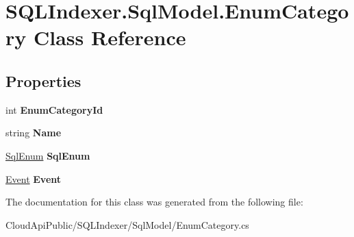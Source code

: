 \hypertarget{class_s_q_l_indexer_1_1_sql_model_1_1_enum_category}{\section{S\-Q\-L\-Indexer.\-Sql\-Model.\-Enum\-Category Class Reference}
\label{class_s_q_l_indexer_1_1_sql_model_1_1_enum_category}
}
\subsection*{Properties}
\begin{DoxyCompactItemize}
\item 
\hypertarget{class_s_q_l_indexer_1_1_sql_model_1_1_enum_category_ab98edd9d27c804192c38e950fcf6fd79}{int {\bfseries Enum\-Category\-Id}}\label{class_s_q_l_indexer_1_1_sql_model_1_1_enum_category_ab98edd9d27c804192c38e950fcf6fd79}

\item 
\hypertarget{class_s_q_l_indexer_1_1_sql_model_1_1_enum_category_a49f67ef6526afc931c7006600258c3ab}{string {\bfseries Name}}\label{class_s_q_l_indexer_1_1_sql_model_1_1_enum_category_a49f67ef6526afc931c7006600258c3ab}

\item 
\hypertarget{class_s_q_l_indexer_1_1_sql_model_1_1_enum_category_aacda12b5a3262a25f0341a1496d5451a}{\hyperlink{class_s_q_l_indexer_1_1_sql_model_1_1_sql_enum}{Sql\-Enum} {\bfseries Sql\-Enum}}\label{class_s_q_l_indexer_1_1_sql_model_1_1_enum_category_aacda12b5a3262a25f0341a1496d5451a}

\item 
\hypertarget{class_s_q_l_indexer_1_1_sql_model_1_1_enum_category_a4d603999ede64861a75a3d6542afa64a}{\hyperlink{class_s_q_l_indexer_1_1_sql_model_1_1_event}{Event} {\bfseries Event}}\label{class_s_q_l_indexer_1_1_sql_model_1_1_enum_category_a4d603999ede64861a75a3d6542afa64a}

\end{DoxyCompactItemize}


The documentation for this class was generated from the following file\-:\begin{DoxyCompactItemize}
\item 
Cloud\-Api\-Public/\-S\-Q\-L\-Indexer/\-Sql\-Model/Enum\-Category.\-cs\end{DoxyCompactItemize}

